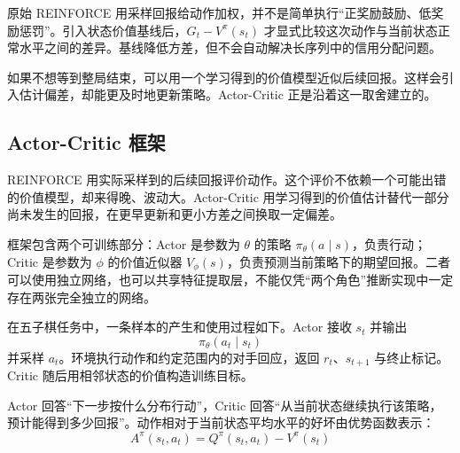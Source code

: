 \begin{importantnote}
原始 REINFORCE 用采样回报给动作加权，并不是简单执行“正奖励鼓励、低奖励惩罚”。引入状态价值基线后，$G_t-V^\pi(s_t)$ 才显式比较这次动作与当前状态正常水平之间的差异。基线降低方差，但不会自动解决长序列中的信用分配问题。
\end{importantnote}

如果不想等到整局结束，可以用一个学习得到的价值模型近似后续回报。这样会引入估计偏差，却能更及时地更新策略。Actor-Critic 正是沿着这一取舍建立的。

\subsection{Actor-Critic 框架}

REINFORCE 用实际采样到的后续回报评价动作。这个评价不依赖一个可能出错的价值模型，却来得晚、波动大。Actor-Critic 用学习得到的价值估计替代一部分尚未发生的回报，在更早更新和更小方差之间换取一定偏差。

框架包含两个可训练部分：Actor 是参数为 $\theta$ 的策略 $\pi_\theta(a\mid s)$，负责行动；Critic 是参数为 $\phi$ 的价值近似器 $V_\phi(s)$，负责预测当前策略下的期望回报。二者可以使用独立网络，也可以共享特征提取层，不能仅凭“两个角色”推断实现中一定存在两张完全独立的网络。

在五子棋任务中，一条样本的产生和使用过程如下。Actor 接收 $s_t$ 并输出
\begin{equation}
\pi_{\theta}(a_t\mid s_t)
\end{equation}
并采样 $a_t$。环境执行动作和约定范围内的对手回应，返回 $r_t$、$s_{t+1}$ 与终止标记。Critic 随后用相邻状态的价值构造训练目标。

%       

Actor 回答“下一步按什么分布行动”，Critic 回答“从当前状态继续执行该策略，预计能得到多少回报”。动作相对于当前状态平均水平的好坏由优势函数表示：
\begin{equation}
A^{\pi}(s_t,a_t)
=
Q^{\pi}(s_t,a_t)
-
V^{\pi}(s_t)
\end{equation}

